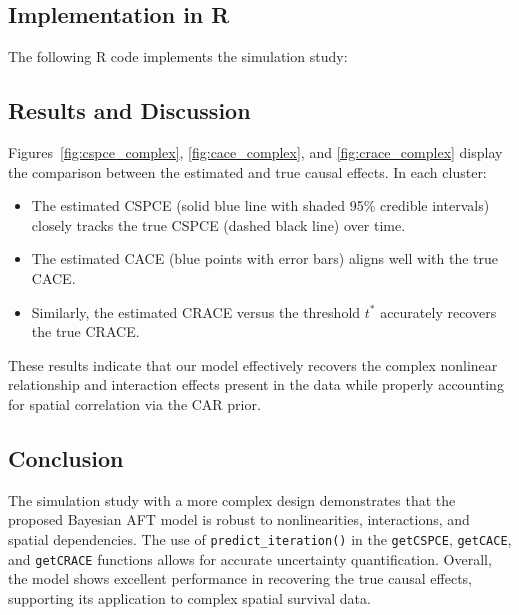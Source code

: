 \documentclass[useAMS,referee]{biom}
\begin{document}
\subsection{Implementation in R}

The following R code implements the simulation study:



\subsection{Results and Discussion}

Figures~\ref{fig:cspce_complex}, \ref{fig:cace_complex}, and \ref{fig:crace_complex} display the comparison between the estimated and true causal effects. In each cluster:
\begin{itemize}
  \item The estimated CSPCE (solid blue line with shaded 95\% credible intervals) closely tracks the true CSPCE (dashed black line) over time.
  \item The estimated CACE (blue points with error bars) aligns well with the true CACE.
  \item Similarly, the estimated CRACE versus the threshold \( t^* \) accurately recovers the true CRACE.
\end{itemize}

These results indicate that our model effectively recovers the complex nonlinear relationship and interaction effects present in the data while properly accounting for spatial correlation via the CAR prior.

\subsection{Conclusion}

The simulation study with a more complex design demonstrates that the proposed Bayesian AFT model is robust to nonlinearities, interactions, and spatial dependencies. The use of \texttt{predict\_iteration()} in the \texttt{getCSPCE}, \texttt{getCACE}, and \texttt{getCRACE} functions allows for accurate uncertainty quantification. Overall, the model shows excellent performance in recovering the true causal effects, supporting its application to complex spatial survival data.
\end{document}
